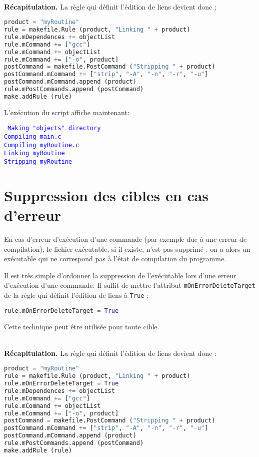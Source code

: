 \documentclass[a4paper,12pt,obeyspaces,openany]{extarticle}
\begin{document}
~\\{\bf Récapitulation.} La règle qui définit l'édition de liens devient donc :
\begin{lstlisting}[language=py]
product = "myRoutine"
rule = makefile.Rule (product, "Linking " + product)
rule.mDependences += objectList
rule.mCommand += ["gcc"]
rule.mCommand += objectList
rule.mCommand += ["-o", product]
postCommand = makefile.PostCommand ("Stripping " + product)
postCommand.mCommand += ["strip", "-A", "-n", "-r", "-u"]
postCommand.mCommand.append (product)
rule.mPostCommands.append (postCommand)
make.addRule (rule)
\end{lstlisting}

L'exécution du script affiche maintenant:

\noindent\texttt{\footnotesize
\textcolor{blue}{Making "objects" directory}\\
\textcolor{blue}{Compiling main.c}\\
\textcolor{blue}{Compiling myRoutine.c}\\
\textcolor{blue}{Linking myRoutine}\\
\textcolor{blue}{Stripping myRoutine}
}







\section{Suppression des cibles en cas d'erreur}

En cas d'erreur d'exécution d'une commande (par exemple due à une erreur de compilation), le fichier exécutable, si il existe, n'est pas supprimé : on a alors un exécutable qui ne correspond pas à l'état de compilation du programme.

Il est très simple d'ordonner la suppression de l'exécutable lors d'une erreur d'exécution d'une commande. Il suffit de mettre l'attribut \texttt{mOnErrorDeleteTarget} de la règle qui définit l'édition de liens à \texttt{True} :
\begin{lstlisting}[language=py]
rule.mOnErrorDeleteTarget = True
\end{lstlisting}
Cette technique peut être utilisée pour toute cible.

~\\{\bf Récapitulation.} La règle qui définit l'édition de liens devient donc :
\begin{lstlisting}[language=py]
product = "myRoutine"
rule = makefile.Rule (product, "Linking " + product)
rule.mOnErrorDeleteTarget = True
rule.mDependences += objectList
rule.mCommand += ["gcc"]
rule.mCommand += objectList
rule.mCommand += ["-o", product]
postCommand = makefile.PostCommand ("Stripping " + product)
postCommand.mCommand += ["strip", "-A", "-n", "-r", "-u"]
postCommand.mCommand.append (product)
rule.mPostCommands.append (postCommand)
make.addRule (rule)
\end{lstlisting}
\end{document}
